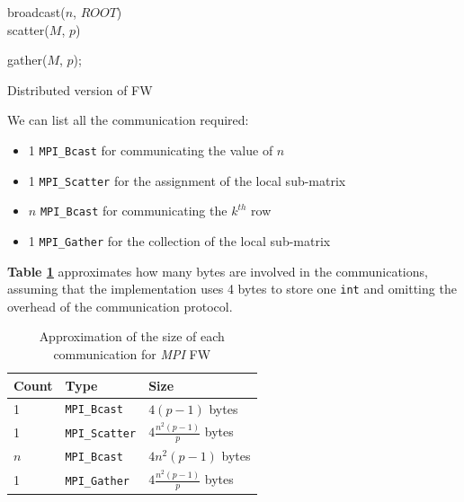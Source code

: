\begin{algorithm}[h!]

\SetAlgoLined

broadcast($n$, $ROOT$) \\
scatter($M$, $p$)

gather($M$, $p$);
 
\caption{Distributed version of FW}\label{alg:mpi}
\end{algorithm}


We can list all the communication required:
\begin{itemize}
\item{1 \texttt{MPI\_Bcast} for communicating the value of $n$}
\item{1 \texttt{MPI\_Scatter} for the assignment of the local sub-matrix}
\item{$n$ \texttt{MPI\_Bcast} for communicating the $k^{th}$ row}
\item{1 \texttt{MPI\_Gather} for the collection of the local sub-matrix}
\end{itemize}

\textbf{Table \ref*{tab:comm}} approximates how many bytes are involved in the communications, assuming that
the implementation uses 4 bytes to store one \texttt{int} and omitting the overhead of the communication protocol.
\begin{table}[h!]
\centering
\begin{tabular}{|l|l|l|}
\hline
\rowcolor[HTML]{F56B00} 
{\color[HTML]{FFFFFF} \textbf{Count}} & {\color[HTML]{FFFFFF} \textbf{Type}} & {\color[HTML]{FFFFFF} \textbf{Size}} \\ \hline
1                                     &  \texttt{MPI\_Bcast}                 &  $4(p-1)$ bytes                      \\ \hline
1                                     &  \texttt{MPI\_Scatter}               &  $4\frac{n^2(p-1)}{p}$ bytes         \\ \hline
$n$                               &  \texttt{MPI\_Bcast}                 &  $4n^2(p-1)$ bytes                    \\ \hline
1                                     &  \texttt{MPI\_Gather}                &  $4\frac{n^2(p-1)}{p}$ bytes         \\ \hline
\end{tabular}
\caption{Approximation of the size of each communication for \emph{MPI} FW}                                                                                                                                            
\label{tab:comm}
\end{table}
\par

